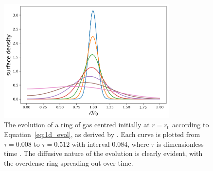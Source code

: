 \begin{figure}
    \centering
    \includegraphics[width = 0.8\textwidth]{figures/armitage_ringspread.png}
    \caption{The evolution of a ring of gas centred initially at $r=r_0$ according to Equation~\eqref{eq:1d_evol}, as derived by \citet{lynden-bell1974}. Each curve is plotted from $\tau=0.008$ to $\tau=0.512$ with interval 0.084, where $\tau$ is dimensionless time \citep[figure from lecture notes by][]{armitage2022}. The diffusive nature of the evolution is clearly evident, with the overdense ring spreading out over time.}
    \label{fig:ring_spreading}
\end{figure}

